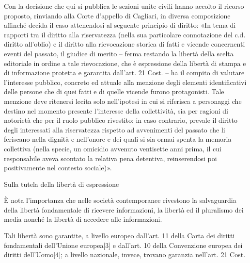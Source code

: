 Con la decisione che qui si pubblica le sezioni unite civili hanno accolto il ricorso proposto, rinviando alla Corte d’appello di Cagliari, in diversa composizione affinché decida il caso attenendosi al seguente principio di diritto: «In tema di rapporti tra il diritto alla riservatezza (nella sua particolare connotazione del c.d. diritto all’oblio) e il diritto alla rievocazione storica di fatti e vicende concernenti eventi del passato, il giudice di merito – ferma restando la libertà della scelta editoriale in ordine a tale rievocazione, che è espressione della libertà di stampa e di informazione protetta e garantita dall’art. 21 Cost. – ha il compito di valutare l’interesse pubblico, concreto ed attuale alla menzione degli elementi identificativi delle persone che di quei fatti e di quelle vicende furono protagonisti. Tale menzione deve ritenersi lecita solo nell’ipotesi in cui si riferisca a personaggi che destino nel momento presente l’interesse della collettività, sia per ragioni di notorietà che per il ruolo pubblico rivestito; in caso contrario, prevale il diritto degli interessati alla riservatezza rispetto ad avvenimenti del passato che li feriscano nella dignità e nell’onore e dei quali si sia ormai spenta la memoria collettiva (nella specie, un omicidio avvenuto ventisette anni prima, il cui responsabile aveva scontato la relativa pena detentiva, reinserendosi poi positivamente nel contesto sociale)».



Sulla tutela della libertà di espressione

È nota l’importanza che nelle società contemporanee rivestono la salvaguardia della libertà fondamentale di ricevere informazioni, la libertà ed il pluralismo dei media nonché la libertà di accedere alle informazioni.

Tali libertà sono garantite, a livello europeo dall’art. 11 della Carta dei diritti fondamentali dell’Unione europea[3] e dall’art. 10 della Convenzione europea dei diritti dell’Uomo[4]; a livello nazionale, invece, trovano garanzia nell’art. 21 Cost.

